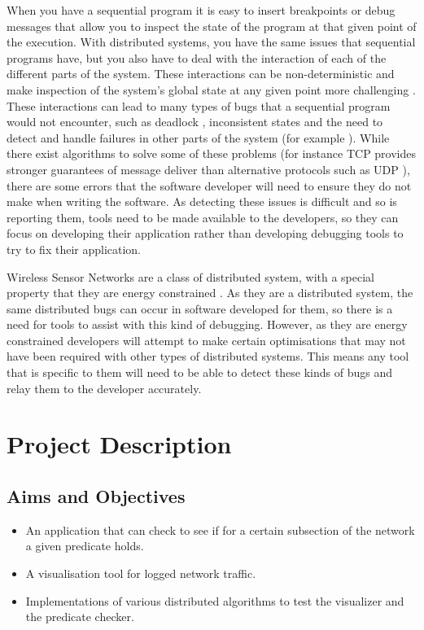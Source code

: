 \documentclass[a4paper]{article}
\begin{document}
When you have a sequential program it is easy to insert breakpoints or debug messages that allow you to inspect the state of the program at that given point of the execution. With distributed systems, you have the same issues that sequential programs have, but you also have to deal with the interaction of each of the different parts of the system. These interactions can be non-deterministic \cite{liu2007wids} and make inspection of the system's global state at any given point more challenging \cite{chandy1985distributed}. These interactions can lead to many types of bugs that a sequential program would not encounter, such as deadlock \cite{singhal1989deadlock}, inconsistent states \cite{chandy1985distributed} and the need to detect and handle failures in other parts of the system (for example \cite{5623434}). While there exist algorithms to solve some of these problems (for instance TCP provides stronger guarantees of message deliver than alternative protocols such as UDP \cite[p.~532]{Tanenbaum:2002:CN:572404}), there are some errors that the software developer will need to ensure they do not make when writing the software. As detecting these issues is difficult and so is reporting them, tools need to be made available to the developers, so they can focus on developing their application rather than developing debugging tools to try to fix their application.

Wireless Sensor Networks are a class of distributed system, with a special property that they are energy constrained \cite{6023235}.  As they are a distributed system, the same distributed bugs can occur in software developed for them, so there is a need for tools to assist with this kind of debugging. However, as they are energy constrained developers will attempt to make certain optimisations that may not have been required with other types of distributed systems. This means any tool that is specific to them will need to be able to detect these kinds of bugs and relay them to the developer accurately.


\section{Project Description}

\subsection{Aims and Objectives}
\begin{itemize}
	\item An application that can check to see if for a certain subsection of the network a given predicate holds.
	\item A visualisation tool for logged network traffic.
	\item Implementations of various distributed algorithms to test the visualizer and the predicate checker.
\end{itemize}
\end{document}
